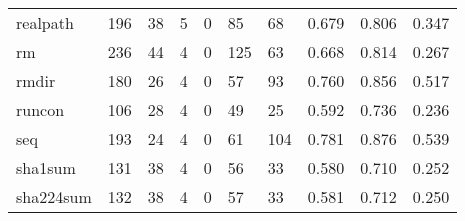 \begin{longtable}{lp{1.3cm}p{1.3cm}p{1.3cm}p{1.3cm}p{1.3cm}p{1.3cm}p{1.3cm}p{1.3cm}p{1.3cm}}
realpath  &                    196 &                                 38 &                                 5 &                                0 &                                85 &                              68 &                                0.679 &                                  0.806 &                                0.347 \\
rm        &                    236 &                                 44 &                                 4 &                                0 &                               125 &                              63 &                                0.668 &                                  0.814 &                                0.267 \\
rmdir     &                    180 &                                 26 &                                 4 &                                0 &                                57 &                              93 &                                0.760 &                                  0.856 &                                0.517 \\
runcon    &                    106 &                                 28 &                                 4 &                                0 &                                49 &                              25 &                                0.592 &                                  0.736 &                                0.236 \\
seq       &                    193 &                                 24 &                                 4 &                                0 &                                61 &                             104 &                                0.781 &                                  0.876 &                                0.539 \\
sha1sum   &                    131 &                                 38 &                                 4 &                                0 &                                56 &                              33 &                                0.580 &                                  0.710 &                                0.252 \\
sha224sum &                    132 &                                 38 &                                 4 &                                0 &                                57 &                              33 &                                0.581 &                                  0.712 &                                0.250 \\

\end{longtable}
